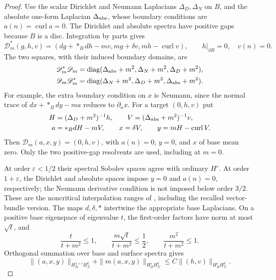\documentclass[11pt]{amsart}
\theoremstyle{definition}
\theoremstyle{remark}
\theoremstyle{plain}
\begin{document}
\begin{proof}
Use the scalar Dirichlet and Neumann Laplacians $\Delta_D,\Delta_N$
on $B$, and the absolute one-form Laplacian $\Delta_{\rm abs}$,
whose boundary conditions are $a(n)=\operatorname{curl}a=0$.
The Dirichlet and absolute spectra have positive gaps because $B$
is a disc. Integration by parts gives
\[
 \mathscr D_m^*(g,h,v)
 =(dg+*_Bdh-mv,mg+\delta v,mh-\operatorname{curl}v),
 \qquad h|_{\partial B}=0,\quad v(n)=0.
\]
The two squares, with their induced boundary domains, are
\begin{equation}\label{eq:fractional-flat-squares}
 \begin{split}
 \mathscr D_m^*\mathscr D_m
 &=\operatorname{diag}(\Delta_{\rm abs}+m^2,
                       \Delta_N+m^2,\Delta_D+m^2),\\
 \mathscr D_m\mathscr D_m^*
 &=\operatorname{diag}(\Delta_N+m^2,
                       \Delta_D+m^2,\Delta_{\rm abs}+m^2).
 \end{split}
\end{equation}
For example, the extra boundary condition on $x$ is Neumann,
since the normal trace of $dx+*_Bdy-ma$ reduces to $\partial_nx$.
For a target $(0,h,v)$ put
\begin{equation}\label{eq:fractional-flat-resolvent}
 \begin{split}
 H&=(\Delta_D+m^2)^{-1}h,\qquad
 V=(\Delta_{\rm abs}+m^2)^{-1}v,\\
 a&=*_BdH-mV,\qquad x=\delta V,\qquad
 y=mH-\operatorname{curl}V.
 \end{split}
\end{equation}
Then $\mathscr D_m(a,x,y)=(0,h,v)$, with $a(n)=0$, $y=0$,
and $x$ of base mean zero. Only the two positive-gap resolvents
are used, including at $m=0$.

At order $\varepsilon<1/2$ their spectral Sobolev spaces agree
with ordinary $H^\varepsilon$. At order $1+\varepsilon$, the
Dirichlet and absolute spaces impose $y=0$ and $a(n)=0$,
respectively; the Neumann derivative condition is not imposed
below order $3/2$. These are the noncritical interpolation ranges
of \cite[Definition~2.1 and Theorem~2.2, pp.~833--834]{Grubb16},
including the recalled vector-bundle version. The maps $d,\delta,*$
intertwine the appropriate base Laplacians. On a positive base
eigenspace of eigenvalue $t$, the first-order factors have norm
at most $\sqrt t$, and
\[
 \frac{t}{t+m^2}\leq1,\qquad
 \frac{m\sqrt t}{t+m^2}\leq\frac12,\qquad
 \frac{m^2}{t+m^2}\leq1.
\]
Orthogonal summation over base and surface spectra gives
\begin{equation}\label{eq:fractional-flat-auxiliary}
 \|(a,x,y)\|_{H_B^{1+\varepsilon}H_\Sigma^k}
 +\|m(a,x,y)\|_{H_B^\varepsilon H_\Sigma^k}
                    \leq C\|(h,v)\|_{H_B^\varepsilon H_\Sigma^k}.
\end{equation}


\end{proof}
\end{document}
